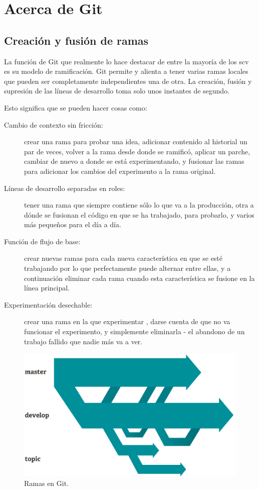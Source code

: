 \documentclass[12pt, spanish, oneside, onecolumn, a4paper]{report}
\begin{document}
\section{Acerca de Git}
\label{sec:aboutgit}

\subsection{Creación y fusión de ramas}
\label{sec:branchingandmerging}

La función de Git que realmente lo hace destacar de entre la mayoría de los \gls{scv} es su modelo de ramificación. Git permite y alienta a tener varias ramas locales que pueden ser completamente independientes una de otra. La creación, fusión y supresión de las líneas de desarrollo toma solo unos instantes de segundo.

Esto significa que se pueden hacer cosas como:
\begin{description}
\item [Cambio de contexto sin fricción:] crear una rama para probar una idea,
adicionar contenido al historial un par de veces, volver a la rama desde donde se ramificó, aplicar un
parche, cambiar de nuevo a donde se está experimentando, y fusionar las ramas para adicionar los cambios del experimento a la rama original.
\item [Líneas de desarrollo separadas en roles:] tener una rama que siempre contiene sólo lo que va a la producción, otra a dónde se fusionan el código en que se ha trabajado, para probarlo, y varios más pequeños para el día a día.
\item [Función de flujo de base:] crear nuevas ramas para cada nueva característica en que se esté trabajando por lo que perfectamente puede alternar entre ellas, y a continuación eliminar cada rama cuando esta característica se fusione en la línea principal.
\item [Experimentación desechable:] crear una rama en la que experimentar , darse cuenta de que no va funcionar el experimento, y simplemente eliminarla - el abandono de un trabajo fallido que nadie más va a ver.
\end{description}

\begin{figure}[hb]
  \caption{Ramas en Git.}
  \centering
  \includegraphics[width=.7\textwidth,keepaspectratio=true]{branches.png}
\end{figure}
\end{document}
